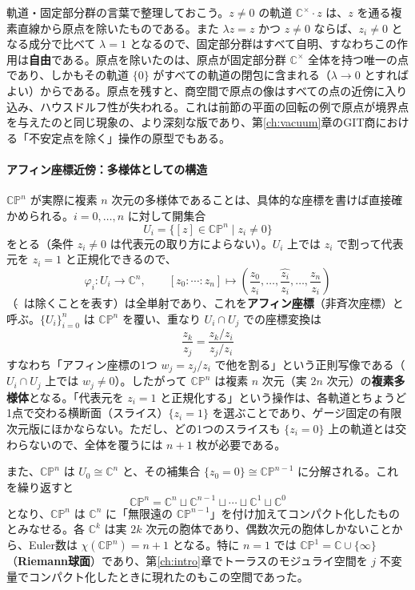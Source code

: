 \documentclass[uplatex, dvipdfmx, book]{jsbook}
\begin{document}
軌道・固定部分群の言葉で整理しておこう。$z \neq 0$ の軌道 $\mathbb{C}^\times \cdot z$ は、$z$ を通る複素直線から原点を除いたものである。また $\lambda z = z$ かつ $z \neq 0$ ならば、$z_i \neq 0$ となる成分で比べて $\lambda = 1$ となるので、固定部分群はすべて自明、すなわちこの作用は\textbf{自由}である。原点を除いたのは、原点が固定部分群 $\mathbb{C}^\times$ 全体を持つ唯一の点であり、しかもその軌道 $\{0\}$ がすべての軌道の閉包に含まれる（$\lambda \to 0$ とすればよい）からである。原点を残すと、商空間で原点の像はすべての点の近傍に入り込み、ハウスドルフ性が失われる。これは前節の平面の回転の例で原点が境界点を与えたのと同じ現象の、より深刻な版であり、第\ref{ch:vacuum}章のGIT商における「不安定点を除く」操作の原型でもある。

\paragraph{アフィン座標近傍：多様体としての構造}
$\mathbb{CP}^n$ が実際に複素 $n$ 次元の多様体であることは、具体的な座標を書けば直接確かめられる。$i = 0, \dots, n$ に対して開集合
\begin{equation}
    U_i = \{ [z] \in \mathbb{CP}^n \mid z_i \neq 0 \}
\end{equation}
をとる（条件 $z_i \neq 0$ は代表元の取り方によらない）。$U_i$ 上では $z_i$ で割って代表元を $z_i = 1$ と正規化できるので、
\begin{equation}
    \varphi_i : U_i \to \mathbb{C}^n, \qquad [z_0 : \cdots : z_n] \mapsto \left( \frac{z_0}{z_i}, \dots, \widehat{\frac{z_i}{z_i}}, \dots, \frac{z_n}{z_i} \right)
\end{equation}
（$\widehat{\ }$ は除くことを表す）は全単射であり、これを\textbf{アフィン座標}（非斉次座標）と呼ぶ。$\{U_i\}_{i=0}^n$ は $\mathbb{CP}^n$ を覆い、重なり $U_i \cap U_j$ での座標変換は
\begin{equation}
    \frac{z_k}{z_j} = \frac{z_k / z_i}{z_j / z_i}
\end{equation}
すなわち「アフィン座標の1つ $w_j = z_j/z_i$ で他を割る」という正則写像である（$U_i \cap U_j$ 上では $w_j \neq 0$）。したがって $\mathbb{CP}^n$ は複素 $n$ 次元（実 $2n$ 次元）の\textbf{複素多様体}となる。「代表元を $z_i = 1$ と正規化する」という操作は、各軌道とちょうど1点で交わる横断面（スライス）$\{z_i = 1\}$ を選ぶことであり、ゲージ固定の有限次元版にほかならない。ただし、どの1つのスライスも $\{z_i = 0\}$ 上の軌道とは交わらないので、全体を覆うには $n+1$ 枚が必要である。

また、$\mathbb{CP}^n$ は $U_0 \cong \mathbb{C}^n$ と、その補集合 $\{z_0 = 0\} \cong \mathbb{CP}^{n-1}$ に分解される。これを繰り返すと
\begin{equation}
    \mathbb{CP}^n = \mathbb{C}^n \sqcup \mathbb{C}^{n-1} \sqcup \cdots \sqcup \mathbb{C}^1 \sqcup \mathbb{C}^0
\end{equation}
となり、$\mathbb{CP}^n$ は $\mathbb{C}^n$ に「無限遠の $\mathbb{CP}^{n-1}$」を付け加えてコンパクト化したものとみなせる。各 $\mathbb{C}^k$ は実 $2k$ 次元の胞体であり、偶数次元の胞体しかないことから、Euler数は $\chi(\mathbb{CP}^n) = n + 1$ となる。特に $n = 1$ では $\mathbb{CP}^1 = \mathbb{C} \cup \{\infty\}$（\textbf{Riemann球面}）であり、第\ref{ch:intro}章でトーラスのモジュライ空間を $j$ 不変量でコンパクト化したときに現れたのもこの空間であった。
\end{document}

